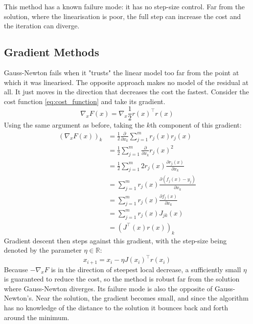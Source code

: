 \documentclass[12pt,a4paper]{report}
\theoremstyle{definition}
\begin{document}
This method has a known failure mode: it has no step-size control. Far from the solution, where the linearisation is poor, the full step can increase the cost and the iteration can diverge.
\subsection{Gradient Methods}
Gauss-Newton fails when it "trusts" the linear model too far from the point at which it was linearised. The opposite approach makes no model of the residual at all. It just moves in the direction that decreases the cost the fastest. Consider the cost function \eqref{eq:cost_function} and take its gradient.
\begin{equation}
  \nabla_x F(x) = \nabla_x \frac{1}{2} r(x)^\top r(x)
\end{equation}
Using the same argument as before, taking the $k$th component of this gradient:
\begin{align}
  \left(\nabla_x F(x)\right)_k &= \frac{1}{2} \frac{\partial}{\partial x_k} \sum_{j = 1}^{m} r_j(x) r_j(x) \\
                &= \frac{1}{2} \sum_{j = 1}^{m} \frac{\partial}{\partial x_k} r_j(x)^2 \\
                &= \frac{1}{2} \sum_{j = 1}^m 2r_j(x) \frac{\partial r_j(x)}{\partial x_k} \\
                &= \sum_{j = 1}^m r_j(x) \frac{\partial (f_j(x) - y_j)}{\partial x_k} \\
                &= \sum_{j = 1}^m r_j(x) \frac{\partial f_j(x)}{\partial x_k} \\
                &= \sum_{j=1}^m r_j(x) J_{jk}(x) \\
                &= \left(J^\top(x) r(x)\right)_k
\end{align}
Gradient descent then steps against this gradient, with the step-size being denoted by the parameter $\eta \in \mathbb{R}$:
\begin{equation}
  x_{i + 1} = x_i - \eta J(x_i)^\top r(x_i) 
\end{equation}
Because $-\nabla_x F$ is in the direction of steepest local decrease, a sufficiently small $\eta$ is guaranteed to reduce the cost, so the method is robust far from the solution where Gauss-Newton diverges. Its failure mode is also the opposite of Gauss-Newton's. Near the solution, the gradient becomes small, and since the algorithm has no knowledge of the distance to the solution it bounces back and forth around the minimum.
\end{document}
